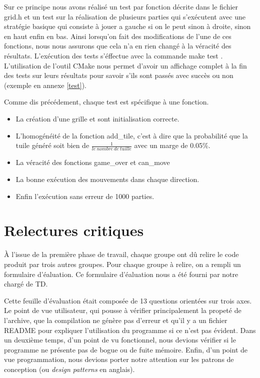 \documentclass[12pt]{article}
\begin{document}
\par Sur ce principe nous avons r\'ealis\'e un test par fonction d\'ecrite dans
le fichier \og grid.h \fg{} et un test sur la r\'ealisation de plusieurs parties
qui s'ex\'ecutent avec une strat\'egie basique qui consiste \`a jouer a gauche
si on le peut sinon \`a droite, sinon en haut enfin en bas. Ainsi lorsqu'on fait
des modifications de l'une de ces fonctions, nous nous assurons que cela n'a en
rien chang\'e \`a la v\'eracit\'e des r\'esultats. L'ex\'ecution des tests
s'\'effectue avec la commande \og make test \fg{}. L'utilisation de l'outil \og CMake \fg{} nous permet d'avoir un affichage complet \`a la fin
des tests sur leurs r\'esultats pour savoir s'ils sont pass\'es avec succ\`es
ou non (exemple en annexe \ref{test}).

\par Comme dis pr\'ec\'edement, chaque test est sp\'ecifique \`a une fonction.
\begin{itemize}
  \item La cr\'eation d'une grille et sont initialisation correcte.
  \item L'homog\'en\'eit\'e de la fonction add\_tile, c'est \`a dire que la
  probabilit\'e que la tuile g\'en\'er\'e soit bien de $
  \frac{1}{le\ nombre\ de\ tuille} $ avec un marge de 0.05\%.
  \item La v\'eracit\'e des fonctions \og game\_over \fg{} et \og can\_move
  \fg{}
  \item La bonne ex\'ecution des mouvements dans chaque direction.
  \item Enfin l'ex\'ecution sans erreur de 1000 parties.
\end{itemize}

\newpage
\section{Relectures critiques}
\`A l’issue de la premi\`ere phase de travail, chaque groupe ont d\^u relire le
code produit par trois autres groupes. Pour chaque groupe \`a relire, on a
rempli un formulaire d’\'ealuation. Ce formulaire d’\'ealuation nous a \'et\'e
fourni par notre charg\'e de TD.

\par Cette feuille d'\'evaluation \'etait compos\'ee de 13 questions orient\'ees
sur trois axes. Le point de vue utilisateur, qui pousse \`a v\'erifier
principalement la propet\'e de l'archive, que la compilation ne g\'en\`ere pas
d'erreur et qu'il y a un fichier \og README \fg{} pour expliquer l'utilisation
du programme si ce n'est pas \'evident. Dans un deuxi\`eme temps, d'un point de
vu fonctionnel, nous devions v\'erifier si le programme ne pr\'esente pas de
bogue ou de fuite m\'emoire. Enfin, d'un point de vue programmation, nous
devions porter notre attention sur les patrons de conception (ou \textit{design
patterns} en anglais).
\end{document}
